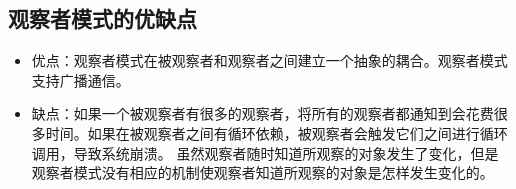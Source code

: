 \documentclass[../main.tex]{subfiles}
\begin{document}
\subsection{观察者模式的优缺点}
\begin{itemize}
  \item 优点：观察者模式在被观察者和观察者之间建立一个抽象的耦合。观察者模式支持广播通信。
  \item 缺点：如果一个被观察者有很多的观察者，将所有的观察者都通知到会花费很多时间。如果在被观察者之间有循环依赖，被观察者会触发它们之间进行循环调用，导致系统崩溃。
    虽然观察者随时知道所观察的对象发生了变化，但是观察者模式没有相应的机制使观察者知道所观察的对象是怎样发生变化的。
\end{itemize}
%
\end{document}
